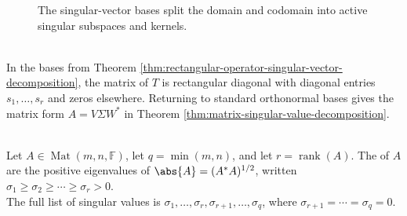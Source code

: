 \begin{figure}[H]
  \centering
  
  \caption{The singular-vector bases split the domain and codomain into active singular subspaces and kernels.}
  \label{fig:singular-subspaces-adjoint-symmetry}
\end{figure}

\begin{perspective} \label{per:operator-to-matrix-svd-bridge} \\
In the bases from Theorem \ref{thm:rectangular-operator-singular-vector-decomposition}, the matrix of $T$ is rectangular diagonal with diagonal entries $s_1,\ldots,s_r$ and zeros elsewhere. Returning to standard orthonormal bases gives the matrix form $A=V\Sigma W^*$ in Theorem \ref{thm:matrix-singular-value-decomposition}.
\end{perspective}

\begin{definition} \label{def:matrix-singular-values} \\
Let $A\in\operatorname{Mat}(m,n,\mathbb{F})$, let $q=\min(m,n)$, and let $r=\operatorname{rank}(A)$. The  of $A$ are the positive eigenvalues of $\abs{A}=(A^*A)^{1/2}$, written $\sigma_1\geq\sigma_2\geq\cdots\geq\sigma_r>0$.\\
The full list of singular values is $\sigma_1,\ldots,\sigma_r,\sigma_{r+1},\ldots,\sigma_q$, where $\sigma_{r+1}=\cdots=\sigma_q=0$.
\end{definition}

